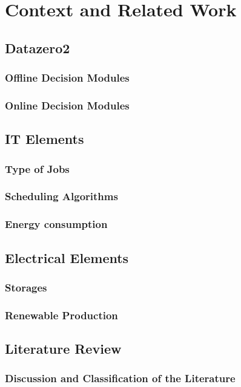 \chapter{Context and Related Work}

\section{Datazero2}

\subsection{Offline Decision Modules}

\subsection{Online Decision Modules}

\section{IT Elements}

\subsection{Type of Jobs}

\subsection{Scheduling Algorithms}

\subsection{Energy consumption}

\section{Electrical Elements}

\subsection{Storages}

\subsection{Renewable Production}

\section{Literature Review}

\subsection{Discussion and Classification of the Literature}